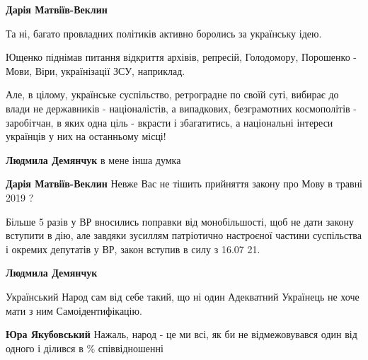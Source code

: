 \begin{itemize}
\begin{itemize}
\textbf{Дарія Матвіїв-Веклин}

Та ні, багато провладних політиків активно боролись за українську ідею.

Ющенко піднімав питання відкриття архівів, репресій, Голодомору, Порошенко -
Мови, Віри, українізації ЗСУ, наприклад.

Але, в цілому, українське суспільство, ретроградне по своїй суті, вибирає до
влади не державників - націоналістів, а випадкових, безграмотних космополітів -
заробітчан, в яких одна ціль - вкрасти і збагатитись, а національні інтереси
українців у них на останньому місці!


 
\textbf{Людмила Демянчук} в мене інша думка

 
\textbf{Дарія Матвіїв-Веклин}
Невже Вас не тішить прийняття закону про Мову в травні 2019 ?

Більше 5 разів у ВР вносились поправки від монобільшості, щоб не дати закону
вступити в дію, але завдяки зусиллям патріотично настроєної частини суспільства
і окремих депутатів у ВР, закон вступив в силу з 16.07 21.


 
\textbf{Людмила Демянчук} 

Український Народ сам від себе такий, що ні один Адекватний Українець не хоче
мати з ним Самоідентифікацію.


 
\textbf{Юра Якубовський}
Нажаль, народ - це ми всі, як би не відмежовувався один від одного і ділився в
\% співвідношенні



\end{itemize}
\end{itemize}
